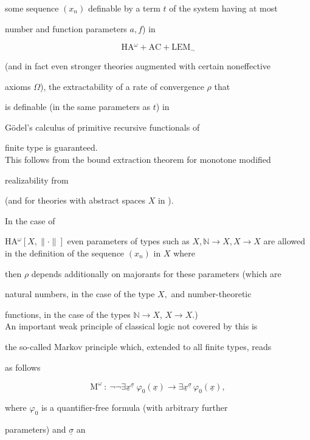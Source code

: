 \documentclass[1p]{elsarticle}
\newcommand{\NN}{\ensuremath{\mathbb{N}}}
\theoremstyle{plain}
\theoremstyle{definition}
\theoremstyle{remark}
\theoremstyle{definition}
\begin{document}
some sequence $(x_n)$ definable by a term $t$ of the system having at most 

number and function parameters $a,f$) in 

\[ \mbox{HA$^{\omega} +$AC$+$LEM}_{\neg} \] 

(and in fact even stronger theories augmented with certain noneffective 

axioms $\Omega$), the extractability of a rate of convergence $\rho$ that 

is definable (in the same parameters as $t$) in  

G\"odel's calculus of primitive recursive functionals of 

finite type is guaranteed.  \\ 

This follows from the bound extraction theorem for monotone modified 

realizability from \cite{Kohlenbach(relative),Kohlenbach(book)} 

(and for theories with abstract spaces $X$ in \cite{GerKoh06}). 

In the case of 

HA$^{\omega}[X,\| \cdot\|]$ even parameters of types such as $X, \NN\to X, 

X\to X$ are allowed in the definition of the sequence $(x_n)$ in $X$ where 

then $\rho$ depends additionally on majorants for these parameters (which are 

natural numbers, in the case of the type $X,$ and number-theoretic 

functions, in the case of the types $\NN\to X$, $X\to X.$) \\[2mm] 

An important weak principle of classical logic not covered by this is 

the so-called Markov principle which, extended to all finite types, reads 

as follows 

\[ \mbox{M}^{\omega}\ :\ 

\neg\neg\exists \underline{x}^{\underline{\sigma}} \ 

\varphi_0(\underline{x})\to 

\exists \underline{x}^{\underline{\sigma}}\,\varphi_0(\underline{x}), \] 

where $\varphi_0$ is a quantifier-free formula (with arbitrary further 

parameters) and $\underline{\sigma}$ an 
\end{document}
